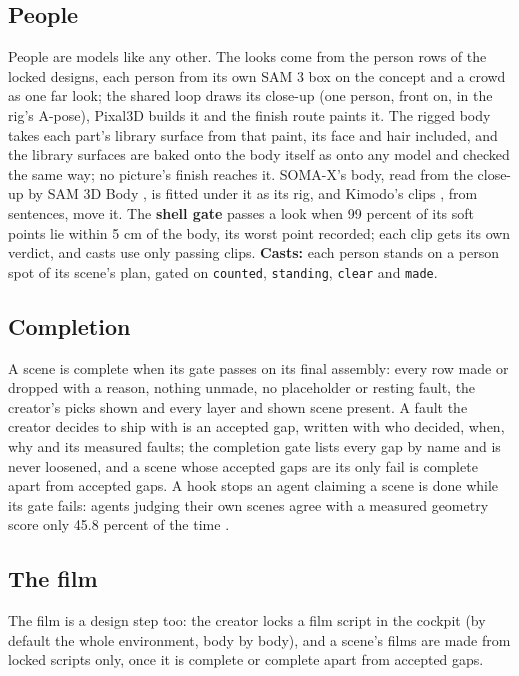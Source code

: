 \subsection{People}\label{people}

People are models like any other. The looks come from the person rows of the locked designs, each person from its own SAM 3 box on the concept and a crowd as one far look; the shared loop draws its close-up (one person, front on, in the rig's A-pose), Pixal3D builds it and the finish route paints it. The rigged body takes each part's library surface from that paint, its face and hair included, and the library surfaces are baked onto the body itself as onto any model and checked the same way; no picture's finish reaches it. SOMA-X's body, read from the close-up by SAM 3D Body \citep{yang2026sam3dbody}, is fitted under it as its rig, and Kimodo's clips \citep{rempe2026kimodo}, from sentences, move it. The \textbf{shell gate} passes a look when 99 percent of its soft points lie within 5 cm of the body, its worst point recorded; each clip gets its own verdict, and casts use only passing clips. \textbf{Casts:} each person stands on a person spot of its scene's plan, gated on \texttt{counted}, \texttt{standing}, \texttt{clear} and \texttt{made}.

\subsection{Completion}\label{completion}

A scene is complete when its gate passes on its final assembly: every row made or dropped with a reason, nothing unmade, no placeholder or resting fault, the creator's picks shown and every layer and shown scene present. A fault the creator decides to ship with is an accepted gap, written with who decided, when, why and its measured faults; the completion gate lists every gap by name and is never loosened, and a scene whose accepted gaps are its only fail is complete apart from accepted gaps. A hook stops an agent claiming a scene is done while its gate fails: agents judging their own scenes agree with a measured geometry score only 45.8 percent of the time \citep{li2026lego}.

\subsection{The film}\label{the-film}

The film is a design step too: the creator locks a film script in the cockpit (by default the whole environment, body by body), and a scene's films are made from locked scripts only, once it is complete or complete apart from accepted gaps.

